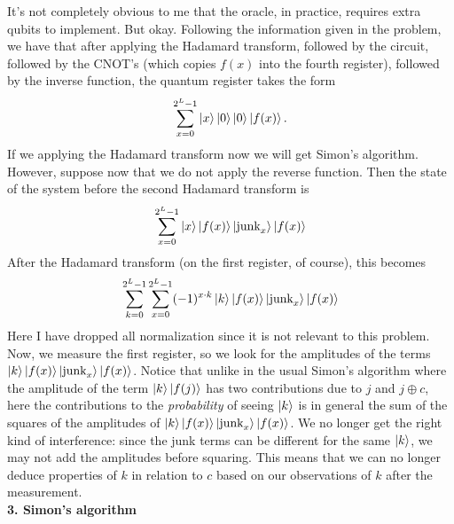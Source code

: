 \documentclass{article}
\theoremstyle{definition}
\begin{document}
\noindent It's not completely obvious to me that the oracle, in practice, requires extra qubits to implement. But okay. Following the information given in the problem, we have that after applying the Hadamard transform, followed by the circuit, followed by the CNOT's (which copies $f(x)$ into the fourth register), followed by the inverse function, the quantum register takes the form
\begin{align*}
	\sum_{x=0}^{2^L-1} \ket{x}\ket{0}\ket{0} \ket{f(x)}.
\end{align*}
If we applying the Hadamard transform now we will get Simon's algorithm. However, suppose now that we do not apply the reverse function. Then the state of the system before the second Hadamard transform is 
\begin{align*}
	\sum_{x=0}^{2^L-1} \ket{x}\ket{f(x)}\ket{\text{junk}_x} \ket{f(x)}
\end{align*}
After the Hadamard transform (on the first register, of course), this becomes
\begin{align*}
	\sum_{k=0}^{2^L-1}\sum_{x=0}^{2^L-1}  (-1)^{x\cdot k}\ket{k}\ket{f(x)}\ket{\text{junk}_x} \ket{f(x)}
\end{align*}
Here I have dropped all normalization since it is not relevant to this problem. Now, we measure the first register, so we look for the amplitudes of the terms $\ket{k}\ket{f(x)}\ket{\text{junk}_x} \ket{f(x)}$. Notice that unlike in the usual Simon's algorithm where the amplitude of the term $\ket{k}\ket{f(j)}$ has two contributions due to $j$ and $j\oplus c$, here the contributions to the \textit{probability} of seeing $\ket{k}$ is in general the sum of the squares of the amplitudes of $\ket{k}\ket{f(x)}\ket{\text{junk}_x} \ket{f(x)}$. We no longer get the right kind of interference: since the junk terms can be different for the same $\ket{k}$, we may not add the amplitudes before squaring. This means that we can no longer deduce properties of $k$ in relation to $c$ based on our observations of $k$ after the measurement.\\



\noindent \textbf{3. Simon's algorithm}
\end{document}
